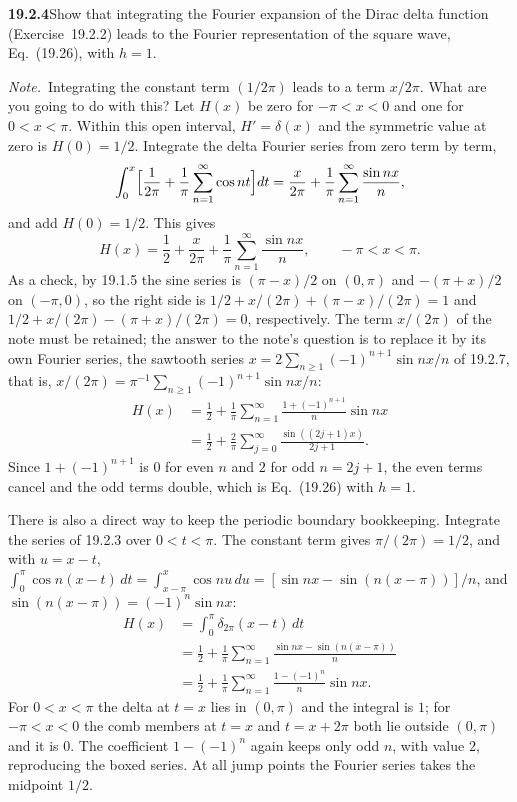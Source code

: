 \par\bigskip
\noindent\textbf{19.2.4}\quad Show that integrating the Fourier
expansion of the Dirac delta function (Exercise~19.2.2) leads to
the Fourier representation of the square wave, Eq.~(19.26), with
$h=1$.
\par\emph{Note.}~Integrating the constant term $(1/2\pi)$ leads to
a term $x/2\pi$. What are you going to do with this?
\solution
Let $H(x)$ be zero for $-\pi<x<0$ and one for $0<x<\pi$.
Within this open interval, $H'=\delta(x)$ and the symmetric value at
zero is $H(0)=1/2$. Integrate the delta Fourier series from zero term
by term,
\[
\int_0^x\Bigl[\frac1{2\pi}+\frac1\pi\sum_{n=1}^{\infty}\cos nt\Bigr]dt
=\frac x{2\pi}+\frac1\pi\sum_{n=1}^{\infty}\frac{\sin nx}n,
\]
and add $H(0)=1/2$. This gives
\[
H(x)=\frac12+\frac{x}{2\pi}
+\frac1\pi\sum_{n=1}^{\infty}\frac{\sin nx}{n},
\qquad -\pi<x<\pi.
\]
As a check, by 19.1.5 the sine series is $(\pi-x)/2$ on $(0,\pi)$ and
$-(\pi+x)/2$ on $(-\pi,0)$, so the right side is
$1/2+x/(2\pi)+(\pi-x)/(2\pi)=1$ and
$1/2+x/(2\pi)-(\pi+x)/(2\pi)=0$, respectively.
The term $x/(2\pi)$ of the note must be retained; the answer to the
note's question is to replace it by its own Fourier series, the
sawtooth series $x=2\sum_{n\ge1}(-1)^{n+1}\sin nx/n$ of 19.2.7, that
is, $x/(2\pi)=\pi^{-1}\sum_{n\ge1}(-1)^{n+1}\sin nx/n$:
\begin{align*}
H(x)&=\frac12+\frac1\pi\sum_{n=1}^{\infty}
\frac{1+(-1)^{n+1}}n\sin nx\\
&=\boxed{\frac12+\frac2\pi\sum_{j=0}^{\infty}
\frac{\sin((2j+1)x)}{2j+1}}.
\end{align*}
Since $1+(-1)^{n+1}$ is $0$ for even $n$ and $2$ for odd $n=2j+1$, the
even terms cancel and the odd terms double, which is Eq.~(19.26) with
$h=1$.

There is also a direct way to keep the periodic boundary bookkeeping.
Integrate the series of 19.2.3 over $0<t<\pi$. The constant term gives
$\pi/(2\pi)=1/2$, and with $u=x-t$,
$\int_0^\pi\cos n(x-t)\,dt=\int_{x-\pi}^x\cos nu\,du
=[\sin nx-\sin(n(x-\pi))]/n$, and
$\sin(n(x-\pi))=(-1)^n\sin nx$:
\begin{align*}
H(x)&=\int_0^\pi\delta_{2\pi}(x-t)\,dt\\
&=\frac12+\frac1\pi\sum_{n=1}^{\infty}
\frac{\sin nx-\sin(n(x-\pi))}{n}\\
&=\frac12+\frac1\pi\sum_{n=1}^{\infty}
\frac{1-(-1)^n}{n}\sin nx.
\end{align*}
For $0<x<\pi$ the delta at $t=x$ lies in $(0,\pi)$ and the integral is
$1$; for $-\pi<x<0$ the comb members at $t=x$ and $t=x+2\pi$ both lie
outside $(0,\pi)$ and it is $0$. The coefficient $1-(-1)^n$ again keeps
only odd $n$, with value $2$, reproducing the boxed series.
At all jump points the Fourier series takes the midpoint $1/2$.

